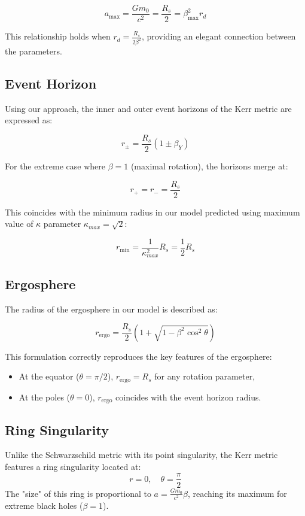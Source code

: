 \documentclass[12pt, a4paper]{article}
\begin{document}
\[
a_{\max} = \frac{G m_0}{c^2} = \frac{R_s}{2} =\beta_{\max}^2  r_{d}
\]

This relationship holds when \(r_{d} = \frac{R_s}{2 \beta^2}\), providing an elegant connection between the parameters.

\subsection{Event Horizon}
Using our approach, the inner and outer event horizons of the Kerr metric are expressed as:

\[
r_{\pm} = \frac{R_s}{2} \left(1 \pm {\beta_Y}\right)
\]

For the extreme case where \(\beta = 1\) (maximal rotation), the horizons merge at:

\[
r_{+} = r_{-} = \frac{R_s}{2}
\]

This coincides with the minimum radius in our model predicted using maximum value of $\kappa$ parameter $\kappa_{max}=\sqrt{2}$:

\[
r_{\min} = \frac{1}{\kappa_{max}^2} R_s = \frac{1}{2} R_s
\]

\subsection{Ergosphere}
The radius of the ergosphere in our model is described as:

\[
r_{\text{ergo}} = \frac{R_s}{2} \left(1 + \sqrt{1 - \beta^2 \cos^2 \theta}\right)
\]

This formulation correctly reproduces the key features of the ergosphere:
\begin{itemize}
    \item At the equator (\(\theta = \pi / 2\)), \(r_{\text{ergo}} = R_s\) for any rotation parameter,
    \item At the poles (\(\theta = 0\)), \(r_{\text{ergo}}\) coincides with the event horizon radius.
\end{itemize}

\subsection{Ring Singularity}
Unlike the Schwarzschild metric with its point singularity, the Kerr metric features a ring singularity located at:
\[
r = 0, \quad \theta = \frac{\pi}{2}
\]
The "size" of this ring is proportional to \(a = \frac{G m_0}{c^2} \beta\), reaching its maximum for extreme black holes (\(\beta = 1\)).
\end{document}
